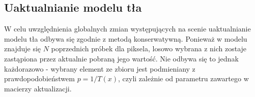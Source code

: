 \subsection{Uaktualnianie modelu tła}
W celu uwzględnienia globalnych zmian występujących na scenie uaktualnianie modelu tła odbywa się zgodnie z metodą konserwatywną. Ponieważ w modelu znajduje się $N$ poprzednich próbek dla piksela, losowo wybrana z nich zostaje zastąpiona przez aktualnie pobraną jego wartość. Nie odbywa się to jednak każdorazowo - wybrany element ze zbioru jest podmieniany z prawdopodobieństwem $p = 1/T(x)$, czyli zależnie od parametru zawartego w macierzy aktualizacji. 